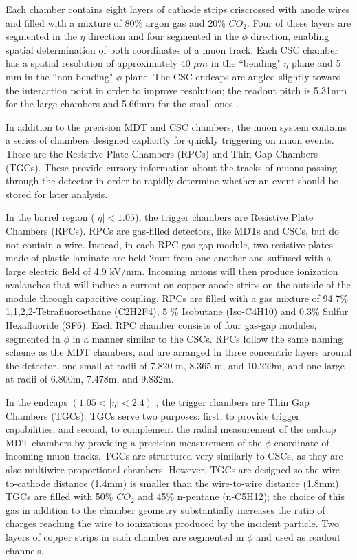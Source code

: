 Each chamber contains eight layers of cathode strips criscrossed with anode wires and filled with a mixture of 80\% argon gas and 20\% $CO_2$. Four of these layers are segmented in the $\eta$ direction and four segmented in the $\phi$ direction, enabling spatial determination of both coordinates of a muon track. Each CSC chamber has a spatial resolution of approximately 40 $\mu m$ in the ``bending" $\eta$ plane and 5 mm in the ``non-bending" $\phi$ plane. The CSC endcaps are angled slightly toward the interaction point in order to improve resolution; the readout pitch is 5.31mm for the large chambers and 5.66mm for the small ones \cite{CSCs}.

In addition to the precision MDT and CSC chambers, the muon system contains a series of chambers designed explicitly for quickly triggering on muon events. These are the Resistive Plate Chambers (RPCs) and Thin Gap Chambers (TGCs). These provide cursory information about the tracks of muons passing through the detector in order to rapidly determine whether an event should be stored for later analysis.

In the barrel region ($| \eta | < 1.05 $), the trigger chambers are Resistive Plate Chambers (RPCs). RPCs are gas-filled detectors, like MDTs and CSCs, but do not contain a wire. Instead, in each RPC gas-gap module, two resistive plates made of plastic laminate are held 2mm from one another and suffused with a large electric field of 4.9 kV/mm. Incoming muons will then produce ionization avalanches that will induce a current on copper anode strips on the outside of the module through capacitive coupling. RPCs are filled with a gas mixture of 94.7\% 1,1,2,2-Tetrafluoroethane (C2H2F4), 5 \% Isobutane (Iso-C4H10) and 0.3\% Sulfur Hexafluoride (SF6). Each RPC chamber consists of four gas-gap modules, segmented in $\phi$ in a manner similar to the CSCs. RPCs follow the same naming scheme as the MDT chambers, and are arranged in three concentric layers around the detector, one small at radii of 7.820 m, 8.365 m, and 10.229m, and one large at radii of 6.800m, 7.478m, and 9.832m.

In the endcaps $(1.05 <|\eta| < 2.4)$ , the trigger chambers are Thin Gap Chambers (TGCs). TGCs serve two purposes: first, to provide trigger capabilities, and second, to complement the radial measurement of the endcap MDT chambers by providing a precision measurement of the $\phi$ coordinate of incoming muon tracks. TGCs are structured very similarly to CSCs, as they are also multiwire proportional chambers. However, TGCs are designed so the wire-to-cathode distance (1.4mm) is smaller than the wire-to-wire distance (1.8mm). TGCs are filled with 50\% $CO_2$ and 45\% n-pentane (n-C5H12); the choice of this gas in addition to the chamber geometry substantially increases the ratio of charges reaching the wire to ionizations produced by the incident particle. Two layers of copper strips in each chamber are segmented in $\phi$ and used as readout channels.

